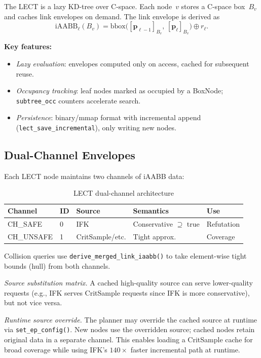 \documentclass[journal]{IEEEtran}
\newcommand{\iAABB}{\text{iAABB}}
\begin{document}
The LECT is a lazy KD-tree over C-space.
Each node~$v$ stores a C-space box~$B_v$ and caches link envelopes
on demand.
The link envelope is derived as
\begin{equation}\label{eq:lect_iaabb}
  \iAABB_\ell(B_v)=\mathrm{bbox}\!\bigl([\bm{p}_{\ell-1}]_{B_v},\,
  [\bm{p}_\ell]_{B_v}\bigr)\oplus r_\ell.
\end{equation}

\textbf{Key features:}
\begin{itemize}[nosep]
  \item \emph{Lazy evaluation}: envelopes computed only on access, cached
    for subsequent reuse.
  \item \emph{Occupancy tracking}: leaf nodes marked as occupied by a
    BoxNode; \texttt{subtree\_occ} counters accelerate search.
  \item \emph{Persistence}: binary/mmap format with incremental append
    (\texttt{lect\_save\_incremental}), only writing new nodes.
\end{itemize}

\subsection{Dual-Channel Envelopes}

Each LECT node maintains two channels of iAABB data:

\begin{table}[ht]
\centering
\caption{LECT dual-channel architecture}
\label{tab:channels}
\begin{tabular}{@{}lllll@{}}
\toprule
\textbf{Channel} & \textbf{ID} & \textbf{Source} & \textbf{Semantics} & \textbf{Use} \\
\midrule
CH\_SAFE & 0 & IFK & Conservative $\supseteq$ true & Refutation \\
CH\_UNSAFE & 1 & CritSample/etc. & Tight approx. & Coverage \\
\bottomrule
\end{tabular}
\end{table}

Collision queries use \texttt{derive\_merged\_link\_iaabb()} to take
element-wise tight bounds (hull) from both channels.

\emph{Source substitution matrix.}
A cached high-quality source can serve lower-quality requests (e.g.,
IFK serves CritSample requests since IFK is more conservative), but
not vice versa.

\emph{Runtime source override.}
The planner may override the cached source at runtime via
\texttt{set\_ep\_config()}.
New nodes use the overridden source; cached nodes retain original
data in a separate channel.
This enables loading a CritSample cache for broad coverage while
using IFK's $140{\times}$ faster incremental path at runtime.
\end{document}
